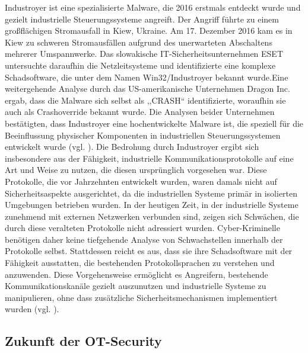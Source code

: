 Industroyer ist eine spezialisierte Malware, die 2016 erstmals entdeckt wurde und gezielt industrielle Steuerungssysteme angreift. Der Angriff führte zu einem großflächigen Stromausfall in Kiew, Ukraine. Am 17. Dezember 2016 kam es in Kiew zu schweren Stromausfällen aufgrund des unerwarteten Abschaltens mehrerer Umspannwerke. Das slowakische IT-Sicherheitsunternehmen ESET untersuchte daraufhin die Netzleitsysteme und identifizierte eine komplexe Schadsoftware, die unter dem Namen Win32/Industroyer bekannt wurde.\clearpage \noindent Eine weitergehende Analyse durch das US-amerikanische Unternehmen Dragon Inc. ergab, dass die Malware sich selbst als ,,CRASH`` identifizierte, woraufhin sie auch als Crashoverride bekannt wurde. Die Analysen beider Unternehmen bestätigten, dass Industroyer eine hochentwickelte Malware ist, die speziell für die Beeinflussung physischer Komponenten in industriellen Steuerungssystemen entwickelt wurde (vgl. \cite{rhebo}). Die Bedrohung durch Industroyer ergibt sich insbesondere aus der Fähigkeit, industrielle Kommunikationsprotokolle auf eine Art und Weise zu nutzen, die diesen ursprünglich vorgesehen war. Diese Protokolle, die vor Jahrzehnten entwickelt wurden, waren damals nicht auf Sicherheitsaspekte ausgerichtet, da die industriellen Systeme primär in isolierten Umgebungen betrieben wurden. In der heutigen Zeit, in der industrielle Systeme zunehmend mit externen Netzwerken verbunden sind, zeigen sich Schwächen, die durch diese veralteten Protokolle nicht adressiert wurden. Cyber-Kriminelle benötigen daher keine tiefgehende Analyse von Schwachstellen innerhalb der Protokolle selbst. Stattdessen reicht es aus, dass sie ihre Schadsoftware mit der Fähigkeit ausstatten, die bestehenden Protokollsprachen zu verstehen und anzuwenden. Diese Vorgehensweise ermöglicht es Angreifern, bestehende Kommunikationskanäle gezielt auszunutzen und industrielle Systeme zu manipulieren, ohne dass zusätzliche Sicherheitsmechanismen implementiert wurden (vgl. \cite{welivesecurity}). 

\subsection{Zukunft der OT-Security}

